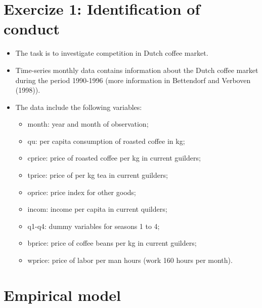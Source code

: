 \documentclass[11pt]{article}
\begin{document}
\section*{Exercize 1: Identification of conduct}

\begin{itemize}
\item The task is to investigate competition in Dutch coffee market.
\item Time-series monthly data contains information about the Dutch coffee
market during the period 1990-1996 (more information in Bettendorf and Verboven (1998)).
\item The data include the following variables:
\begin{itemize}
\item month: year and month of observation;
\item qu: per capita consumption of roasted coffee in kg;
\item cprice: price of roasted coffee per kg in current guilders;
\item tprice: price of per kg tea in current guilders;
\item oprice: price index for other goods;
\item incom: income per capita in current quilders;
\item q1-q4: dummy variables for seasons 1 to 4;
\item bprice: price of coffee beans per kg in current guilders;
\item wprice: price of labor per man hours (work 160 hours per month).
\end{itemize}
\end{itemize}

\section*{Empirical model}
\end{document}
